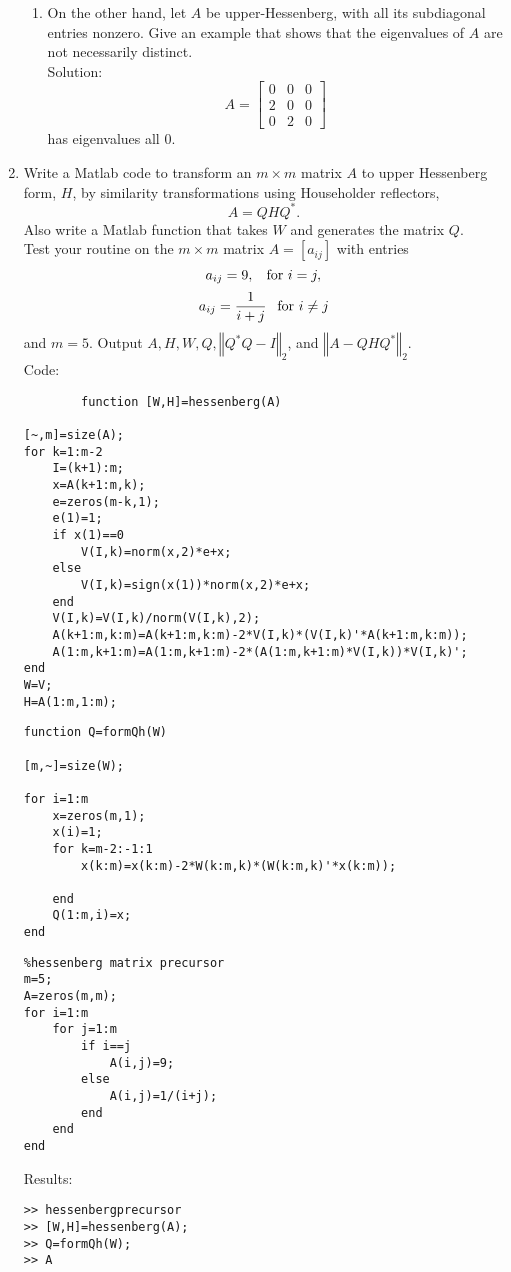 \documentclass[12pt]{article}
\numberwithin{equation}{section}
\newcommand{\norm}[1]{\left\Vert#1\right\Vert}
\begin{document}
\begin{enumerate}
\begin{enumerate}
        \item On the other hand, let $A$ be upper-Hessenberg, with all its subdiagonal entries nonzero. Give an example that shows that the eigenvalues of $A$ are not necessarily distinct.\\

            Solution:
            $$A=\left[\begin{array}{ccc}0&0&0\\2&0&0\\0&2&0\end{array}\right]$$
            has eigenvalues all 0.
        \end{enumerate}
\pagebreak
    \item Write a Matlab code  to transform an $m\times m$ matrix $A$ to upper Hessenberg form, $H$, by similarity transformations using Householder reflectors,
        $$A=QHQ^*.$$
        Also write a Matlab function  that takes $W$ and generates the matrix $Q$.\\
        Test your routine on the $m\times m$ matrix $A=[a_{ij}]$ with entries
        $$a_{ij}=9, \hspace{2 ex}\text{for }i=j,$$
        $$a_{ij}=\frac{1}{i+j}\hspace{1 ex}\text{ for }i\neq j$$
        and $m=5.$
        Output $A,H,W,Q,\norm{Q^*Q-I}_2$, and $\norm{A-QHQ^*}_2.$\\
        
        Code:
        \begin{lstlisting}
        function [W,H]=hessenberg(A)

[~,m]=size(A);
for k=1:m-2
    I=(k+1):m;
    x=A(k+1:m,k);
    e=zeros(m-k,1);
    e(1)=1;
    if x(1)==0
        V(I,k)=norm(x,2)*e+x;
    else
        V(I,k)=sign(x(1))*norm(x,2)*e+x;
    end
    V(I,k)=V(I,k)/norm(V(I,k),2);
    A(k+1:m,k:m)=A(k+1:m,k:m)-2*V(I,k)*(V(I,k)'*A(k+1:m,k:m));
    A(1:m,k+1:m)=A(1:m,k+1:m)-2*(A(1:m,k+1:m)*V(I,k))*V(I,k)';
end
W=V;
H=A(1:m,1:m);
\end{lstlisting}
\begin{lstlisting}
function Q=formQh(W)

[m,~]=size(W);

for i=1:m
    x=zeros(m,1);
    x(i)=1;
    for k=m-2:-1:1
        x(k:m)=x(k:m)-2*W(k:m,k)*(W(k:m,k)'*x(k:m));

    end
    Q(1:m,i)=x;
end
\end{lstlisting}
\begin{lstlisting}
%hessenberg matrix precursor
m=5;
A=zeros(m,m);
for i=1:m
    for j=1:m
        if i==j
            A(i,j)=9;
        else
            A(i,j)=1/(i+j);
        end
    end
end
\end{lstlisting}
Results:
\begin{lstlisting}
>> hessenbergprecursor
>> [W,H]=hessenberg(A);
>> Q=formQh(W);
>> A


\end{lstlisting}
\end{enumerate}
\end{document}
